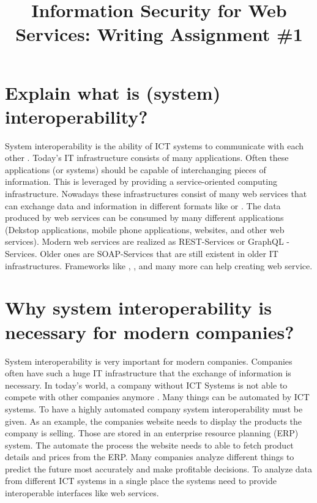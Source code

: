 \documentclass[conference,compsoc,onecolumn]{IEEEtran}
\title{Information Security for Web Services: Writing Assignment \#1}
\author{
  \IEEEauthorblockN{Christoph Stach}
  \IEEEauthorblockA{
    NTUST: National Taiwan University of Science and Technology\\
    Student ID: E10815023\\
    Email: christoph.stach@gmail.com
  }
}
\begin{document}
  \maketitle

  
  \section{Explain what is (system) interoperability?}

    System interoperability is the ability of ICT systems to communicate with each other \cite{whatisinteroperability}. 
    Today's IT infrastructure consists of many applications. 
    Often these applications (or systems) should be capable of interchanging pieces of information. This is leveraged by providing a service-oriented computing infrastructure. 
    Nowadays these infrastructures consist of many web services that can exchange data and information in different formats like \cite{json} or \cite{xml}.
    The data produced by web services can be consumed by many different applications (Dekstop applications, mobile phone applications, websites, and other web services).
    Modern web services are realized as REST-Services \cite{rest} or GraphQL \cite{graphql}-Services. Older ones are SOAP-Services \cite{soap} that are still existent in older IT infrastructures.
    Frameworks like  \cite{spring}, \cite{nestjs},\cite{apollo} and many more can help creating web service.
    
  \section{Why system interoperability is necessary for modern companies?}

    System interoperability is very important for modern companies. 
    Companies often have such a huge IT infrastructure that the exchange of information is necessary. 
    In today's world, a company without ICT Systems is not able to compete with other companies anymore \cite{whatisinteroperability}.
    Many things can be automated by ICT systems.
    To have a highly automated company system interoperability must be given. 
    As an example, the companies website needs to display the products the company is selling. Those are stored in an enterprise resource planning (ERP) system.
    The automate the process the website needs to able to fetch product details and prices from the ERP.
    Many companies analyze different things to predict the future most accurately and make profitable decisions.
    To analyze data from different ICT systems in a single place the systems need to provide interoperable interfaces like web services.
\end{document}
